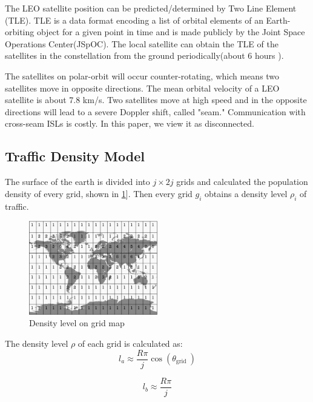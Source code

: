 The LEO satellite position can be predicted/determined by Two Line Element (TLE). TLE is a data format encoding a list of orbital elements of an Earth-orbiting object for a given point in time and is made publicly by the Joint Space Operations Center(JSpOC). The local satellite can obtain the TLE of the satellites in the constellation from the ground periodically(about 6 hours \cite{TLE}).

The satellites on polar-orbit will occur counter-rotating, which means two satellites move in opposite directions. The mean orbital velocity of a LEO satellite is about 7.8 km/s.  Two satellites move at high speed and in the opposite directions will lead to a severe Doppler shift, called "seam." Communication with cross-seam ISLs is costly. In this paper, we view it as disconnected\cite{COUNTERROTATING}.

\subsection{Traffic Density Model}
The surface of the earth is divided into $j \times 2j$ grids  and calculated the population density of every grid\cite{TRAFFICDENSITY}, shown in \ref{fig:TRAFFICDENSITY}]. Then every grid $g_i$ obtains a density level $\rho_i$ of traffic.

\begin{figure}[H]
	\centering
	\includegraphics[scale=0.9,clip, width=0.5\textwidth]{fig/TrafficDensity.png}	
	\caption{Density level on grid map}
	\label{fig:TRAFFICDENSITY}
\end{figure}

The density level $\rho$ of each grid is calculated as:
\begin{equation}
 l_{a} \approx \frac{R \pi}{j} \cos \left(\theta_{\text {grid }}\right) 
\end{equation}

\begin{equation}
 l_{b} \approx \frac{R \pi}{j} 
\end{equation}

